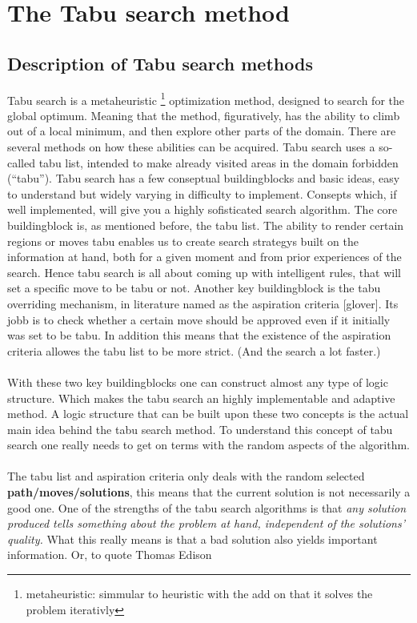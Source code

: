 \section{The Tabu search method}
\subsection{Description of Tabu search methods}
Tabu search is a metaheuristic \footnote{ metaheuristic: simmular to heuristic with the add on that it solves the problem iterativly} optimization method, designed to search for the global optimum. Meaning that the method, figuratively, has the ability to climb out of a local minimum, and then explore other parts of the domain. There are several methods on how these abilities can be acquired. Tabu search uses a so-called tabu list, intended to make already visited areas in the domain forbidden (``tabu''). Tabu search has a few conseptual buildingblocks and basic ideas, easy to understand but widely varying in difficulty to implement. Consepts which, if well implemented, will give you a highly sofisticated search algorithm. The core buildingblock is, as mentioned before, the tabu list. The ability to render certain regions or moves tabu enables us to create search strategys built on the information at hand, both for a given moment and from prior experiences of the search. Hence tabu search is all about coming up with intelligent rules, that will set a specific move to be tabu or not. Another key buildingblock is the tabu overriding mechanism, in literature named as the aspiration criteria [glover]. Its jobb is to check whether a certain move should be approved even if it initially was set to be tabu. In addition this means that the existence of the aspiration criteria allowes the tabu list to be more strict. (And the search a lot faster.)\\
\\
With these two key buildingblocks one can construct almost any type of logic structure. Which makes the tabu search an highly implementable and adaptive method. A logic structure that can be built upon these two concepts is the actual main idea behind the tabu search method. To understand this concept of tabu search one really needs to get on terms with the random aspects of the algorithm.\\
\\The tabu list and aspiration criteria only deals with the random selected \textbf{path/moves/solutions}, this means that the current solution is not necessarily a good one. One of the strengths of the tabu search algorithms is that \emph{any solution produced tells something about the problem at hand, independent of the solutions' quality.} What this really means is that a bad solution also yields important information.  Or, to quote Thomas Edison 
